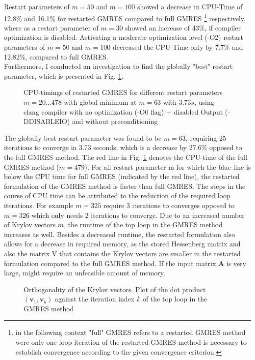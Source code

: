 \documentclass[11pt,a4paper]{article}
\newcommand{\refFig}[1]{Fig. \ref{#1}}
\begin{document}
\renewcommand{\arraystretch}{1}
%
Restart parameters of $m=50$ and $m=100$ showed a decrease in CPU-Time of 12.8\% and 16.1\% for restarted GMRES compared to full GMRES \footnote{in the following context "full" GMRES refers to a restarted GMRES method were only one loop iteration of the restarted GMRES method is necessary to establish convergence according to the given convergence criterion.} respectively, where as a restart parameter of $m=30$ showed an increase of 43\%, if compiler optimization is disabled. Activating a moderate optimization level (-O2) restart parameters of $m=50$ and $m=100$ decreased the CPU-Time only by 7.7\% and 12.82\%, compared to full GMRES.\\
Furthermore, I conducted an investigation to find the globally "best" restart parameter, which is presented in \refFig{fig::Timings}. 
%
\begin{figure}[!htbp]
	\centering
	\hspace*{0.8cm}
	\leavevmode
	\resizebox{0.9\width}{!}{}
	\caption{CPU-timings of restarted GMRES for different restart parameters $m = {20...478} $ with global minimum at $m = 63$ with $3.73 s$, using clang compiler with no optimization (-O0 flag) + disabled Output (-DDISABLEIO) and without preconditioning}
	\label{fig::Timings}
\end{figure}
%
The globally best restart parameter was found to be $m=63$, requiring 25 iterations to converge in 3.73 seconds, which is a decrease by 27.6\% opposed to the full GMRES method. The red line in \refFig{fig::Timings} denotes the CPU-time of the full GMRES method ($m=479$). For all restart parameter m for which the blue line is below the CPU time for full GMRES (indicated by the red line), the restarted formulation of the GMRES method is faster than full GMRES. The steps in the course of CPU time can be attributed to the reduction of the required loop iterations. For example $m=325$ require 3 iterations to converges opposed to $m=326$ which only needs 2 iterations to converge. Due to an increased number of Krylov vectors $m$, the runtime of the top loop in the GMRES method increases as well. Besides a decreased runtime, the restarted formulation also allows for a decrease in required memory, as the stored Hessenberg matrix and also the matrix V that contains the Krylov vectors are smaller in the restarted formulation compared to the full GMRES method. If the input matrix $\mathbf{A}$ is very large, might require an unfeasible amount of memory.\\
%
\begin{figure}[!htbp]
	\centering
	\hspace*{0.8cm}
	\leavevmode
	\resizebox{0.9\width}{!}{}
	\caption{Orthogonality of the Krylov vectors. Plot of the dot product $(\mathbf{v}_1, \mathbf{v}_k)$ against the iteration index $k$ of the top loop in the GMRES method}
	\label{fig::DotP}
\end{figure}
%
\end{document}
